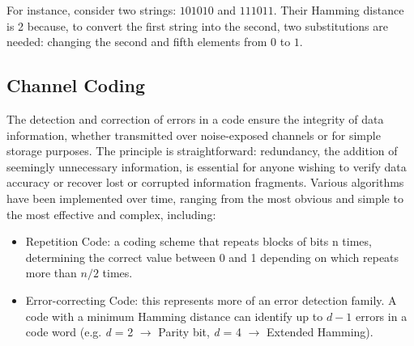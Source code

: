 For instance, consider two strings: $101010$ and $111011$. Their Hamming 
distance is 2 because, to convert the first string into the second, two substitutions are needed: changing the second and fifth elements from $0$ to $1$.

\subsection{Channel Coding}
The detection and correction of errors in a code ensure the integrity of data 
information, whether transmitted over noise-exposed channels or for simple 
storage purposes. The principle is straightforward: redundancy, the addition 
of seemingly unnecessary information, is essential for anyone wishing to 
verify data accuracy or recover lost or corrupted information fragments. 
Various algorithms  have been implemented over 
time, ranging from the most obvious and simple to the most effective and 
complex, including:
\begin{itemize}
    \item Repetition Code: a coding scheme that repeats blocks of bits n  times,
    determining the correct value between 0 and 1 depending on which repeats 
    more than $n/2$ times.
    \item Error-correcting Code: this represents more of an error detection 
    family. 
    A code with a minimum Hamming distance can identify up to $d - 1$ 
    errors in a code word (e.g. \textit{d} = 2 $\rightarrow$ Parity bit, 
    \textit{d} = 4 $\rightarrow$ Extended Hamming).
\end{itemize}

